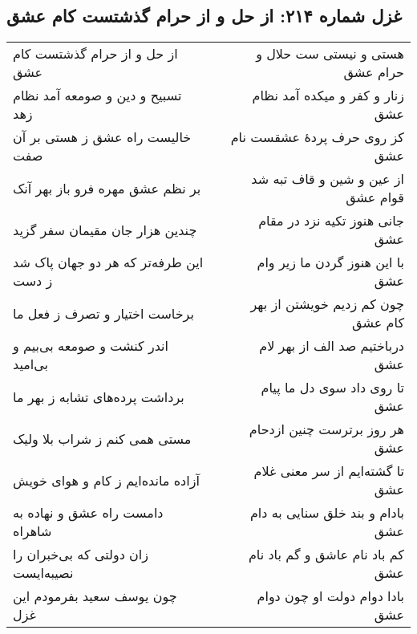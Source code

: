 \begin{center}
\section*{غزل شماره ۲۱۴: از حل و از حرام گذشتست کام عشق}
\label{sec:214}
\begin{longtable}{l p{0.5cm} r}
از حل و از حرام گذشتست کام عشق
&&
هستی و نیستی ست حلال و حرام عشق
\\
تسبیح و دین و صومعه آمد نظام زهد
&&
زنار و کفر و میکده آمد نظام عشق
\\
خالیست راه عشق ز هستی بر آن صفت
&&
کز روی حرف پردهٔ عشقست نام عشق
\\
بر نظم عشق مهره فرو باز بهر آنک
&&
از عین و شین و قاف تبه شد قوام عشق
\\
چندین هزار جان مقیمان سفر گزید
&&
جانی هنوز تکیه نزد در مقام عشق
\\
این طرفه‌تر که هر دو جهان پاک شد ز دست
&&
با این هنوز گردن ما زیر وام عشق
\\
برخاست اختیار و تصرف ز فعل ما
&&
چون کم زدیم خویشتن از بهر کام عشق
\\
اندر کنشت و صومعه بی‌بیم و بی‌امید
&&
درباختیم صد الف از بهر لام عشق
\\
برداشت پرده‌های تشابه ز بهر ما
&&
تا روی داد سوی دل ما پیام عشق
\\
مستی همی کنم ز شراب بلا ولیک
&&
هر روز برترست چنین ازدحام عشق
\\
آزاده مانده‌ایم ز کام و هوای خویش
&&
تا گشته‌ایم از سر معنی غلام عشق
\\
دامست راه عشق و نهاده به شاهراه
&&
بادام و بند خلق سنایی به دام عشق
\\
زان دولتی که بی‌خبران را نصیبه‌ایست
&&
کم باد نام عاشق و گم باد نام عشق
\\
چون یوسف سعید بفرمودم این غزل
&&
بادا دوام دولت او چون دوام عشق
\\
\end{longtable}
\end{center}
